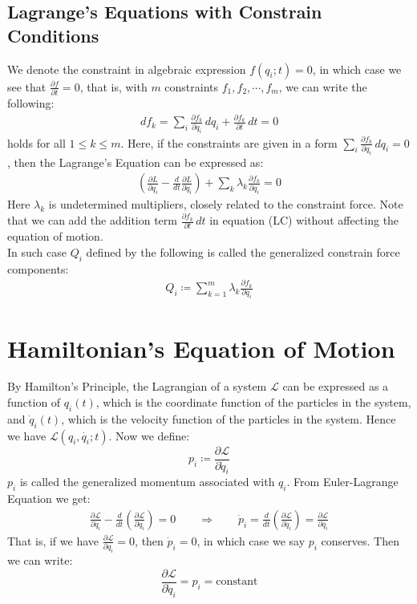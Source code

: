 \documentclass[11pt,oneside]{book}
\theoremstyle{break}
\theoremstyle{break}
\newcommand{\pd}{\partial}
\begin{document}
\subsection*{Lagrange's Equations with Constrain Conditions}
We denote the constraint in algebraic expression $f(q_i; t) = 0$, in which case we see that $\frac{\pd f}{\pd t} = 0$, that is, with $m$ constraints $f_1,f_2,\cdots, f_m$, we can write the following:
\begin{align*}
df_k = \sum_{i} \frac{\partial f_k}{\pd q_i}\, dq_i + \frac{\pd f_k}{\pd t} \, dt = 0
\end{align*}
holds for all $1 \leq k \leq m$. Here, if the constraints are given in a form $\sum_i \frac{\pd f_k}{\pd q_i}\, dq_i = 0$, then the Lagrange's Equation can be expressed as:
\begin{align*}
\left( \frac{\pd L}{\pd q_i} - \frac{d}{dt}\frac{\pd L}{\pd \dot{q}_i} \right) + \sum_k \lambda_k \frac{\pd f_k}{\pd q_i} = 0 \tag{LC}
\end{align*}
Here $\lambda_k$ is undetermined multipliers, closely related to the constraint force. Note that we can add the addition term $\frac{\pd f_k}{\pd t}\, dt$ in equation (LC) without affecting the equation of motion.\\

In such case $Q_i$ defined by the following is called the generalized constrain force components:
\begin{align*}
Q_i \coloneqq \sum_{k=1}^m \lambda_k \frac{\partial f_k}{\partial q_i}
\end{align*}

\newpage
\section[Hamiltonian's Equation of Motion]{\color{red}Hamiltonian's Equation of Motion\color{black}}
By Hamilton's Principle, the Lagrangian of a system $\mathcal{L}$ can be expressed as a function of $q_i(t)$, which is the coordinate function of the particles in the system, and $\dot{q}_i(t)$, which is the velocity function of the particles in the system. Hence we have $\mathcal{L}(q_i, \dot{q_i}; t)$. Now we define: 
$$p_i  \coloneqq \frac{\partial \mathcal{L}}{\partial \dot{q}_i}$$
$p_i$ is called the generalized momentum associated with $q_i$. From Euler-Lagrange Equation we get:
\begin{align*}
\frac{\pd \mathcal{L}}{\pd q_i} - \frac{d}{dt}\left(\frac{\pd \mathcal{L}}{\pd \dot{q}_i} \right) = 0 \qquad \Rightarrow \qquad \dot{p}_i = \frac{d}{dt}\left(\frac{\partial \mathcal{L}}{\partial \dot{q}_i} \right) = \frac{\partial \mathcal{L}}{\partial q_i}
\end{align*}
That is, if we have $\frac{\partial \mathcal{L}}{\partial q_i} = 0$, then $\dot{p}_i =0$, in which case we say $p_i$ conserves. Then we can write: 
$$\frac{\partial \mathcal{L}}{\partial \dot{q}_i} = p_i = \text{constant}$$ 
\end{document}
